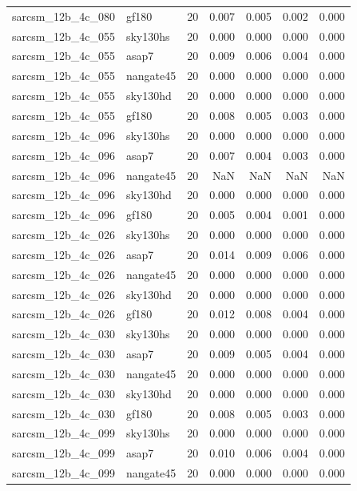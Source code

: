 \begin{tabular}{llrrrrr}
sarcsm\_12b\_4c\_080 & gf180 & 20 & 0.007 & 0.005 & 0.002 & 0.000 \\
sarcsm\_12b\_4c\_055 & sky130hs & 20 & 0.000 & 0.000 & 0.000 & 0.000 \\
sarcsm\_12b\_4c\_055 & asap7 & 20 & 0.009 & 0.006 & 0.004 & 0.000 \\
sarcsm\_12b\_4c\_055 & nangate45 & 20 & 0.000 & 0.000 & 0.000 & 0.000 \\
sarcsm\_12b\_4c\_055 & sky130hd & 20 & 0.000 & 0.000 & 0.000 & 0.000 \\
sarcsm\_12b\_4c\_055 & gf180 & 20 & 0.008 & 0.005 & 0.003 & 0.000 \\
sarcsm\_12b\_4c\_096 & sky130hs & 20 & 0.000 & 0.000 & 0.000 & 0.000 \\
sarcsm\_12b\_4c\_096 & asap7 & 20 & 0.007 & 0.004 & 0.003 & 0.000 \\
sarcsm\_12b\_4c\_096 & nangate45 & 20 & NaN & NaN & NaN & NaN \\
sarcsm\_12b\_4c\_096 & sky130hd & 20 & 0.000 & 0.000 & 0.000 & 0.000 \\
sarcsm\_12b\_4c\_096 & gf180 & 20 & 0.005 & 0.004 & 0.001 & 0.000 \\
sarcsm\_12b\_4c\_026 & sky130hs & 20 & 0.000 & 0.000 & 0.000 & 0.000 \\
sarcsm\_12b\_4c\_026 & asap7 & 20 & 0.014 & 0.009 & 0.006 & 0.000 \\
sarcsm\_12b\_4c\_026 & nangate45 & 20 & 0.000 & 0.000 & 0.000 & 0.000 \\
sarcsm\_12b\_4c\_026 & sky130hd & 20 & 0.000 & 0.000 & 0.000 & 0.000 \\
sarcsm\_12b\_4c\_026 & gf180 & 20 & 0.012 & 0.008 & 0.004 & 0.000 \\
sarcsm\_12b\_4c\_030 & sky130hs & 20 & 0.000 & 0.000 & 0.000 & 0.000 \\
sarcsm\_12b\_4c\_030 & asap7 & 20 & 0.009 & 0.005 & 0.004 & 0.000 \\
sarcsm\_12b\_4c\_030 & nangate45 & 20 & 0.000 & 0.000 & 0.000 & 0.000 \\
sarcsm\_12b\_4c\_030 & sky130hd & 20 & 0.000 & 0.000 & 0.000 & 0.000 \\
sarcsm\_12b\_4c\_030 & gf180 & 20 & 0.008 & 0.005 & 0.003 & 0.000 \\
sarcsm\_12b\_4c\_099 & sky130hs & 20 & 0.000 & 0.000 & 0.000 & 0.000 \\
sarcsm\_12b\_4c\_099 & asap7 & 20 & 0.010 & 0.006 & 0.004 & 0.000 \\
sarcsm\_12b\_4c\_099 & nangate45 & 20 & 0.000 & 0.000 & 0.000 & 0.000 \\

\end{tabular}
